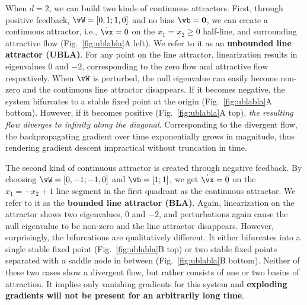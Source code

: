 \documentclass{article} %
\newcounter{ct}
\theoremstyle{definition}
\theoremstyle{remark}
\begin{document}
When $d=2$, we can build two kinds of continuous attractors.
First, through positive feedback, $\vW = [0, 1; 1, 0]$ and no bias $\vb = \mathbf{0}$, we can create a continuous attractor, i.e., $\dot{\vx} = 0$ on the $x_1 = x_2 \geq 0$ half-line, and surrounding attractive flow (Fig.~\ref{fig:ublabla}A left).
We refer to it as an \textbf{unbounded line attractor (UBLA)}.
For any point on the line attractor, linearization results in eigenvalues $0$ and $-2$, corresponding to the zero flow and attractive flow respectively.
When $\vW$ is perturbed, the null eigenvalue can easily become non-zero and the continuous line attractor disappears.
If it becomes negative, the system bifurcates to a stable fixed point at the origin (Fig.~\ref{fig:ublabla}A bottom).
However, if it becomes positive (Fig.~\ref{fig:ublabla}A top), \emph{the resulting flow diverges to infinity along the diagonal}.
Corresponding to the divergent flow, the backpropagating gradient over time exponentially grows in magnitude, thus rendering gradient descent impractical without truncation in time.

The second kind of continuous attractor is created through negative feedback.
By choosing $\vW = [0, -1; -1, 0]$ and $\vb = [1; 1]$, we get $\dot{\vx} = 0$ on the $x_1 = -x_2 + 1$ line segment in the first quadrant as the continuous attractor.
We refer to it as the \textbf{bounded line attractor (BLA)}.
Again, linearization on the attractor shows two eigenvalues, $0$ and $-2$, and perturbations again cause the null eigenvalue to be non-zero and the line attractor disappears.
However, surprisingly, the bifurcations are  qualitatively different.
It either bifurcates into a single stable fixed point (Fig.~\ref{fig:ublabla}B top) or two stable fixed points separated with a saddle node in between (Fig.~\ref{fig:ublabla}B bottom).
Neither of these two cases show a divergent flow, but rather consists of one or two basins of attraction.
It implies only vanishing gradients for this system and \textbf{exploding gradients will not be present for an arbitrarily long time}.
\end{document}
